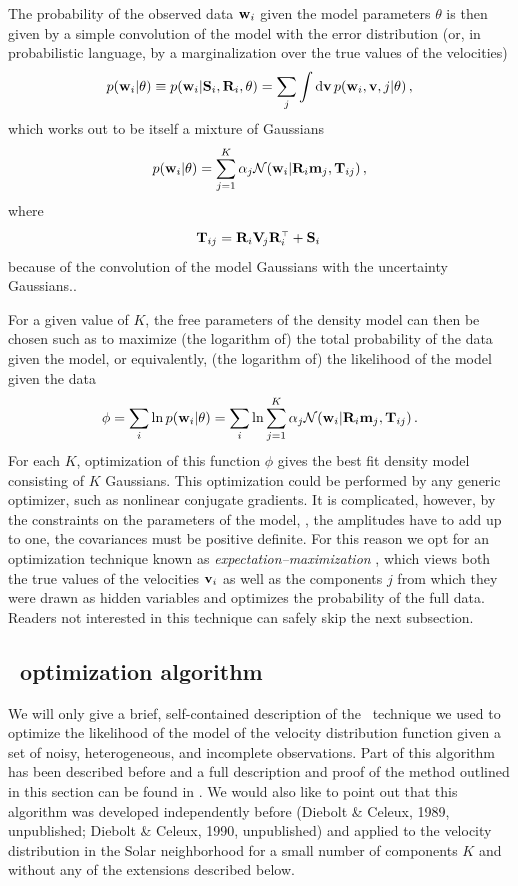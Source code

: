 The probability of the observed data $\mathbf{w}_i$ given the model parameters
$\theta$ is then given by a simple convolution of the model with the
error distribution (or, in probabilistic language, by a
marginalization over the true values of the velocities)
\begin{equation}
p(\mathbf{w}_i|\theta) \equiv p(\mathbf{w}_i|\mathbf{S}_i,\mathbf{R}_i,\theta) =\sum_j\int \mathrm{d}\boldsymbol{\mathbf{v}}\, p(\mathbf{w}_i,\boldsymbol{\mathbf{v}},j|\theta)\, ,
\end{equation}
which works out to be itself a mixture of Gaussians
\begin{equation}
p(\mathbf{w}_i|\theta)  = \sum_{j=1}^K \alpha_j \mathcal{N}(\mathbf{w}_i|\mathbf{R}_i\mathbf{m}_j,\mathbf{T}_{ij})\, ,
\end{equation}
where
\begin{equation}
\mathbf{T}_{ij} = \mathbf{R}_i\mathbf{V}_{\!j}\mathbf{R}_i^{\scriptscriptstyle \top} + \mathbf{S}_i\, 
\end{equation}
because of the convolution of the model Gaussians with the uncertainty
Gaussians..

For a given value of $K$, the free parameters of the density model can
then be chosen such as to maximize (the logarithm of) the total
probability of the data given the model, or equivalently, (the
logarithm of) the likelihood of the model given the data
\begin{equation}\label{eq:likelihood}
\phi = \sum_i \ln p(\mathbf{w}_i|\theta) = \sum_i \ln \sum_{j=1}^K \alpha_j \mathcal{N}(\mathbf{w}_i|\mathbf{R}_i\mathbf{m}_j,\mathbf{T}_{ij})\, .
\end{equation}
For each $K$, optimization of this function $\phi$ gives the best fit
density model consisting of $K$ Gaussians. This optimization could be
performed by any generic optimizer, such as nonlinear conjugate
gradients. It is complicated, however, by the constraints on the
parameters of the model, \eg, the amplitudes have to add up to one,
the covariances must be positive definite. For this reason we opt for
an optimization technique known as \emph{expectation--maximization}
\citep[\EM;][]{Dempster1977}, which views both the true values of the
velocities $\boldsymbol{\mathbf{v}}_i$ as well as the components $j$ from which they were
drawn as hidden variables and optimizes the probability of the
full data. Readers not interested in this technique can safely skip
the next subsection.



\subsection{\EM\ optimization algorithm}

We will only give a brief, self-contained description of the \EM\
technique we used to optimize the likelihood of the model of the
velocity distribution function given a set of noisy, heterogeneous,
and incomplete observations. Part of this algorithm has been described
before \citep[see the appendix of][]{2005ApJ...629..268H} and a full
description and proof of the method outlined in this section can be
found in \citet{Bovy09a}. We would also like to point out that this
algorithm was developed independently before (Diebolt \& Celeux, 1989,
unpublished; Diebolt \& Celeux, 1990, unpublished) and applied to the
velocity distribution in the Solar neighborhood
\citep{1990A&A...236...95G,1997ESASP.402..519F} for a small number of
components $K$ and without any of the extensions described below.

